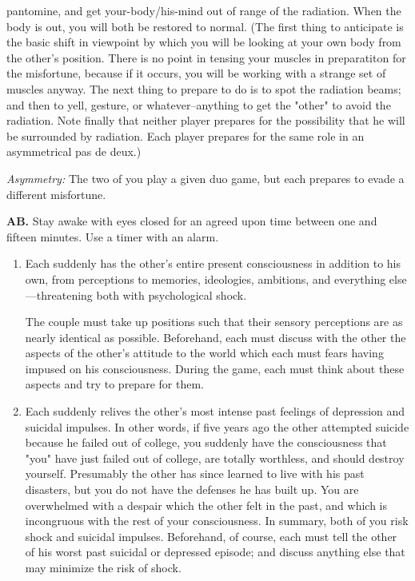 \begin{enumerate}
		pantomine, and get your-body/his-mind out of range of the radiation. When 
		the body is out, you will both be restored to normal. (The first thing to 
		anticipate is the basic shift in viewpoint by which you will be looking at 
		your own body from the other's position. There is no point in tensing your 
		muscles in preparatiton for the misfortune, because if it occurs, you will be 
		working with a strange set of muscles anyway. The next thing to prepare to 
		do is to spot the radiation beams; and then to yell, gesture, or 
		whatever--anything to get the "other" to avoid the radiation. Note finally 
		that neither player prepares for the possibility that he will be surrounded by 
		radiation. Each player prepares for the same role in an asymmetrical pas de 
		deux.) 
\end{enumerate}

\emph{Asymmetry:} The two of you play a given duo game, but each prepares 
to evade a different misfortune. 

\textbf{AB.} Stay awake with eyes closed for an agreed upon time between one 
and fifteen minutes. Use a timer with an alarm. 

\begin{enumerate}
\item Each suddenly has the other's entire present consciousness in addition to 
his own, from perceptions to memories, ideologies, ambitions, and 
everything else---threatening both with psychological shock. 

The couple must take up positions such that their sensory perceptions 
are as nearly identical as possible. Beforehand, each must discuss with the 
other the aspects of the other's attitude to the world which each must fears 
having impused on his consciousness. During the game, each must think 
about these aspects and try to prepare for them. 

\item Each suddenly relives the other's most intense past feelings of depression 
and suicidal impulses. In other words, if five years ago the other attempted 
suicide because he failed out of college, you suddenly have the consciousness 
that "you" have just failed out of college, are totally worthless, and should 
destroy yourself. Presumably the other has since learned to live with his past 
disasters, but you do not have the defenses he has built up. You are 
overwhelmed with a despair which the other felt in the past, and which is 
incongruous with the rest of your consciousness. In summary, both of you 
risk shock and suicidal impulses. Beforehand, of course, each must tell the 
other of his worst past suicidal or depressed episode; and discuss anything 
else that may minimize the risk of shock. 
\end{enumerate}

